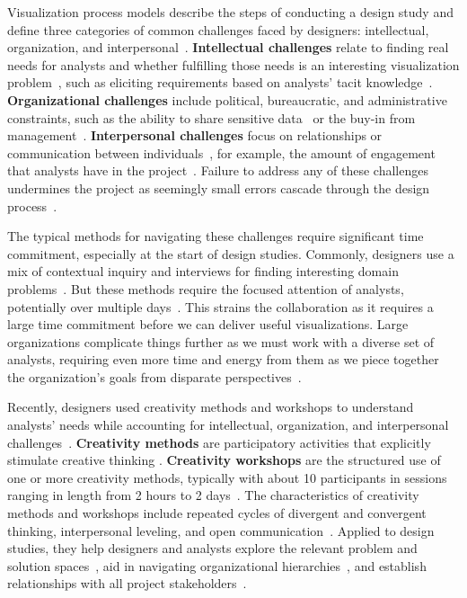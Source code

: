 Visualization process models describe the steps of conducting a design study and define three categories of common challenges faced by designers: intellectual, organization, and interpersonal~\cite{McKenna2014,Munzner2009,Tory2004a,Lloyd2011,Sedlmair2010,Sedlmair2012}. \textbf{Intellectual challenges} relate to finding real needs for analysts and whether fulfilling those needs is an interesting visualization problem~\cite{Sedlmair2012}, such as eliciting requirements based on analysts' tacit knowledge~\cite{Polanyi1974}. \textbf{Organizational challenges} include political, bureaucratic, and administrative constraints, such as the ability to share sensitive data~\cite{Sedlmair2010} or the buy-in from management~\cite{Kerzner2015}. \textbf{Interpersonal challenges} focus on relationships or communication between individuals~\cite{Sedlmair2012}, for example, the amount of engagement that analysts have in the project~\cite{Sedlmair2010}. Failure to address any of these challenges undermines the project as seemingly small errors cascade through the design process~\cite{Munzner2009}.

The typical methods for navigating these challenges require significant time commitment, especially at the start of design studies. Commonly, designers use a mix of contextual inquiry and interviews for finding interesting domain problems~\cite{Sedlmair2012}. But these methods require the focused attention of analysts, potentially over multiple days~\cite{Holtzblatt1993}. This strains the collaboration as it requires a large time commitment before we can deliver useful visualizations. Large organizations complicate things further as we must work with a diverse set of analysts, requiring even more time and energy from them as we piece together the organization's goals from disparate perspectives~\cite{Kerzner2015}. 

Recently, designers used creativity methods and workshops to understand analysts' needs while accounting for intellectual, organization, and interpersonal challenges~\cite{Goodwin2013}. {\bf Creativity methods} are participatory activities that explicitly stimulate creative thinking \cite{Osborn1953}. {\bf Creativity workshops} are the structured use of one or more creativity methods, typically with about 10 participants in sessions ranging in length from 2 hours to 2 days~\cite{Jones2005}. The characteristics of creativity methods and workshops include repeated cycles of divergent and convergent thinking, interpersonal leveling, and open communication~\cite{Osborn1953}. Applied to design studies, they help designers and analysts explore the relevant problem and solution spaces~\cite{Goodwin2013}, aid in navigating organizational hierarchies~\cite{Kerzner2015}, and establish relationships with all project stakeholders~\cite{Goodwin2016}.


